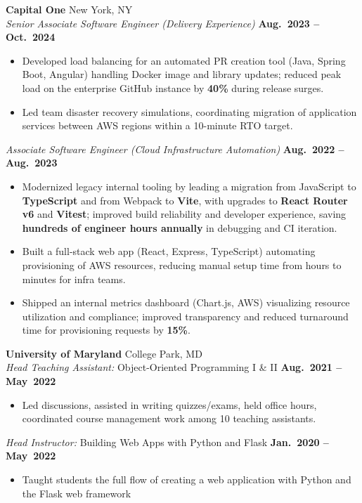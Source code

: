 \documentclass[10pt]{article}
\begin{document}
\textbf{Capital One} \hfill New York, NY\\
\emph{Senior Associate Software Engineer (Delivery Experience)} \hfill \textbf{Aug.\ 2023 -- Oct.\ 2024}
\begin{itemize}
  \item Developed load balancing for an automated PR creation tool (Java, Spring Boot, Angular) handling Docker image and library updates; reduced peak load on the enterprise GitHub instance by \textbf{40\%} during release surges.
  \item Led team disaster recovery simulations, coordinating migration of application services between AWS regions within a 10-minute RTO target.
\end{itemize}
\emph{Associate Software Engineer (Cloud Infrastructure Automation)} \hfill \textbf{Aug.\ 2022 -- Aug.\ 2023}
\begin{itemize}
  \item Modernized legacy internal tooling by leading a migration from JavaScript to \textbf{TypeScript} and from Webpack to \textbf{Vite}, with upgrades to \textbf{React Router v6} and \textbf{Vitest}; improved build reliability and developer experience, saving \textbf{hundreds of engineer hours annually} in debugging and CI iteration.
  \item Built a full-stack web app (React, Express, TypeScript) automating provisioning of AWS resources, reducing manual setup time from hours to minutes for infra teams.
  \item Shipped an internal metrics dashboard (Chart.js, AWS) visualizing resource utilization and compliance; improved transparency and reduced turnaround time for provisioning requests by \textbf{15\%}.
\end{itemize}
\textbf{University of Maryland} \hfill College Park, MD\\
\emph{Head Teaching Assistant:} Object-Oriented Programming I \& II \hfill \textbf{Aug.\ 2021 -- May\ 2022}
\begin{itemize}
  \item Led discussions, assisted in writing quizzes/exams, held office hours, coordinated course management work among 10 teaching assistants.
\end{itemize}
\emph{Head Instructor:} Building Web Apps with Python and Flask \hfill \textbf{Jan.\ 2020 -- May\ 2022}
\begin{itemize}
\item Taught students the full flow of creating a web application with Python and the Flask web framework
\end{itemize}
\end{document}
